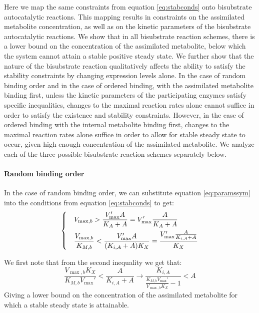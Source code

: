  Here we map the same constraints from equation \ref{eq:stabconds} onto bisubstrate autocatalytic reactions.
  This mapping results in constraints on the assimilated metabolite concentration, as well as on the kinetic parameters of the bisubstrate autocatalytic reactions.
  We show that in all bisubstrate reaction schemes, there is a lower bound on the concentration of the assimilated metabolite, below which the system cannot attain a stable positive steady state.
  We further show that the nature of the bisubstrate reaction qualitatively affects the ability to satisfy the stability constraints by changing expression levels alone.
  In the case of random binding order and in the case of ordered binding, with the assimilated metabolite binding first, unless the kinetic parameters of the participating enzymes satisfy specific inequalities, changes to the maximal reaction rates alone cannot suffice in order to satisfy the existence and stability constraints.
  However, in the case of ordered binding with the internal metabolite binding first, changes to the maximal reaction rates alone suffice in order to allow for stable steady state to occur, given high enough concentration of the assimilated metabolite.
  We analyze each of the three possible bisubstrate reaction schemes separately below.

  \paragraph{Random binding order}
  In the case of random binding order, we can substitute equation \ref{eq:paramssym} into the conditions from equation \ref{eq:stabconds} to get:
  \begin{equation}
    \label{eq:stabcondsrandbind}
    \begin{dcases}
      & V_{\max,b}>\frac{V_{\max}'A}{K_A+A}=V_{\max}'\frac{A}{K_A+A} \\
      & \frac{V_{\max,b}}{K_{M,b}}<\frac{V_{\max}'A}{(K_{i,A}+A)K_X}=\frac{V_{\max}'\frac{A}{K_{i,A}+A}}{K_X}
    \end{dcases}
  \end{equation}

  We first note that from the second inequality we get that:
  \begin{equation}
    \label{eq:assimlowerbound}
      \frac{V_{\max,b}K_X}{K_{M,b}V_{\max}'}<\frac{A}{K_{i,A}+A} \rightarrow
      \frac{K_{i,A}}{\frac{K_{M,b}V_{\max}'}{V_{\max,b}K_X}-1}<A
  \end{equation}
  Giving a lower bound on the concentration of the assimilated metabolite for which a stable steady state is attainable.

